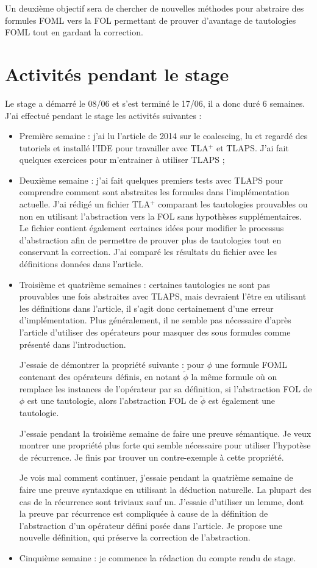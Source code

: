 \documentclass[12pt]{article}
\begin{document}
Un deuxième objectif sera de chercher de nouvelles méthodes pour abstraire des formules FOML vers la FOL permettant de prouver d'avantage de tautologies FOML tout en gardant la correction.

\section{Activités pendant le stage}

Le stage a démarré le 08/06 et s'est terminé le 17/06, il a donc duré 6 semaines.
J'ai effectué pendant le stage les activités suivantes :
\begin{itemize}
\item
  Première semaine :
  j'ai lu l'article de 2014 sur le coalescing, lu et regardé des tutoriels et installé l'IDE pour travailler avec TLA$^+$ et TLAPS. J'ai fait quelques exercices pour m'entrainer à utiliser TLAPS ;
\item
  Deuxième semaine :
  j'ai fait quelques premiers tests avec TLAPS pour comprendre comment sont abstraites les formules dans l'implémentation actuelle.
  J'ai rédigé un fichier TLA$^+$ comparant les tautologies prouvables ou non en utilisant l'abstraction vers la FOL sans hypothèses supplémentaires.
  Le fichier contient également certaines idées pour modifier le processus d'abstraction afin de permettre de prouver plus de tautologies tout en conservant la correction.
  J'ai comparé les résultats du fichier avec les définitions données dans l'article.
\item
  Troisième et quatrième semaines :
  certaines tautologies ne sont pas prouvables une fois abstraites avec TLAPS, mais devraient l'être en utilisant les définitions dans l'article, il s'agit donc certainement d'une erreur d'implémentation.
  Plus généralement, il ne semble pas nécessaire d'après l'article d'utiliser des opérateurs pour masquer des sous formules comme présenté dans l'introduction.
  
  J'essaie de démontrer la propriété suivante : pour $\phi$ une formule FOML contenant des opérateurs définis, en notant $\widetilde{\phi}$ la même formule où on remplace les instances de l'opérateur par sa définition, si l'abstraction FOL de $\phi$ est une tautologie, alors l'abstraction FOL de $\widetilde{\phi}$ est également une tautologie.

  J'essaie pendant la troisième semaine de faire une preuve sémantique.
  Je veux montrer une propriété plus forte qui semble nécessaire pour utiliser l'hypotèse de récurrence.
  Je finis par trouver un contre-exemple à cette propriété.

  Je vois mal comment continuer, j'essaie pendant la quatrième semaine de faire une preuve syntaxique en utilisant la déduction naturelle.
  La plupart des cas de la récurrence sont triviaux sauf un.
  J'essaie d'utiliser un lemme, dont la preuve par récurrence est compliquée à cause de la définition de l'abstraction d'un opérateur défini posée dans l'article.
  Je propose une nouvelle définition, qui préserve la correction de l'abstraction.
\item
  Cinquième semaine :
  je commence la rédaction du compte rendu de stage.
\end{itemize}
\end{document}
